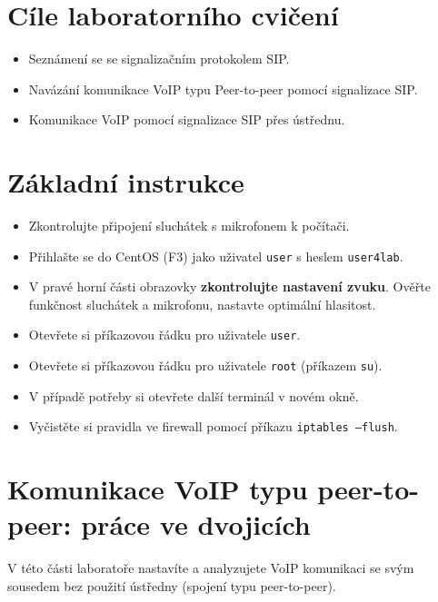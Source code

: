 \section*{Cíle laboratorního cvičení}
\begin{itemize}
  \item Seznámení se se signalizačním protokolem SIP.
  \item Navázání komunikace VoIP typu Peer-to-peer pomocí signalizace SIP.
  \item Komunikace VoIP pomocí signalizace SIP přes ústřednu.
\end{itemize}

\section*{Základní instrukce}
\begin{itemize}
  \item Zkontrolujte připojení sluchátek s mikrofonem k počítači. 
  \item Přihlašte se do CentOS (F3) jako uživatel {\tt user} s heslem {\tt user4lab}.
  \item V pravé horní části obrazovky {\bf zkontrolujte nastavení zvuku}. Ověřte funkčnost sluchátek a mikrofonu, nastavte optimální hlasitost. 
  \item Otevřete si příkazovou řádku pro uživatele {\tt user}.
  \item Otevřete si příkazovou řádku pro uživatele {\tt root} (příkazem {\tt su}).
  \item V případě potřeby si otevřete další terminál v novém okně.
  \item Vyčistěte si pravidla ve firewall pomocí příkazu {\tt iptables --flush}.
\end{itemize}

\section{Komunikace VoIP typu peer-to-peer: práce ve dvojicích}
V této části laboratoře nastavíte a analyzujete VoIP komunikaci se svým sousedem bez použití ústředny (spojení typu peer-to-peer).

